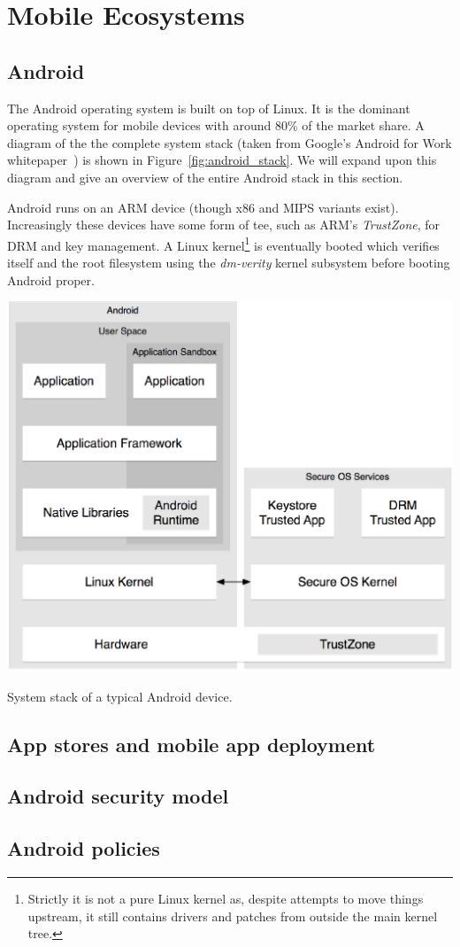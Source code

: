 \documentclass[thesis.tex]{subfiles}
\begin{document}
\chapter{Mobile Ecosystems}

\section{Android}

The Android operating system is built on top of Linux.
It is the dominant operating system for mobile devices with around 80\% of the market share.
A diagram of the the complete system stack (taken from Google's Android for Work whitepaper~\cite{Google:2015vl}) is shown in Figure~\ref{fig:android_stack}.
We will expand upon this diagram and give an overview of the entire Android stack in this section.

Android runs on an ARM device (though x86 and MIPS variants exist).
Increasingly these devices have some form of \ac{tee}, such as ARM's \emph{TrustZone}, for DRM and key management.
A Linux kernel\footnote{Strictly it is not a pure Linux kernel as, despite attempts to move things upstream, it still contains drivers and patches from outside the main kernel tree.}  is eventually booted which verifies itself and the root filesystem using the \emph{dm-verity} kernel subsystem before booting Android proper.





\begin{marginfigure}
  \includegraphics[width=1.0\linewidth]{chapters/02-mobile-ecosystems/figures/android-stack.eps}
  \caption{System stack of a typical Android device.}
  \label{fig:android_stack}
\end{marginfigure}

\section{App stores and mobile app deployment}

\section{Android security model}




\section{Android policies}
\end{document}
